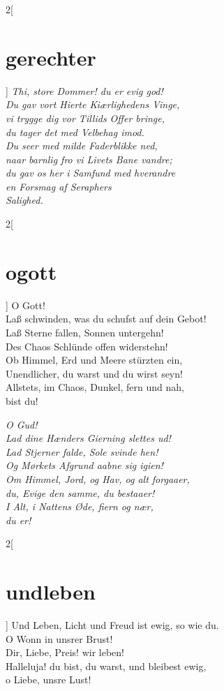 \documentclass[shorttitlesize=45,tocstyle=ref]{ees}
\begin{document}
{\begin{multicols}{2}[\section{gerechter}]
\columnbreak\itshape
Thi, store Dommer! du er evig god!\\
Du gav vort Hierte Kiærlighedens Vinge,\\
vi trygge dig vor Tillids Offer bringe,\\
du tager det med Velbehag imod.\\
Du seer med milde Faderblikke ned,\\
naar barnlig fro vi Livets Bane vandre;\\
du gav os her i Samfund med hverandre\\
en Forsmag af Seraphers\\
\hspace*{1em}Salighed.
\end{multicols}

\clearpage
\begin{multicols}{2}[\section{ogott}]
O Gott!\\
Laß schwinden, was du schufst auf dein Gebot!\\
Laß Sterne fallen, Sonnen untergehn!\\
Des Chaos Schlünde offen widerstehn!\\
Ob Himmel, Erd und Meere stürzten ein,\\
Unendlicher, du warst und du wirst seyn!\\
Allstets, im Chaos, Dunkel, fern und nah,\\
bist du!

\columnbreak\itshape
O Gud!\\
Lad dine Hænders Gierning slettes ud!\\
Lad Stjerner falde, Sole svinde hen!\\
Og Mørkets Afgrund aabne sig igien!\\
Om Himmel, Jord, og Hav, og alt forgaaer,\\
du, Evige den samme, du bestaaer!\\
I Alt, i Nattens Øde, fiern og nær,\\
du er! %
\end{multicols}

\begin{multicols}{2}[\section{undleben}]
Und Leben, Licht und Freud ist ewig, so wie du.\\
O Wonn in unsrer Brust!\\
Dir, Liebe, Preis! wir leben!\\
Halleluja! du bist, du warst, und bleibest ewig,\\
o Liebe, unsre Lust!


\end{multicols}}
\end{document}
